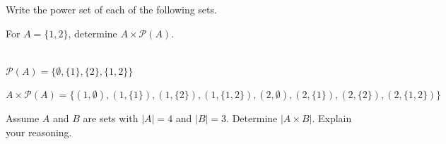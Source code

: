 \documentclass[12 pt]{exam}
\begin{document}
\begin{questions}

\question Write the power set of each of the following sets.


\question For $A=\{ 1, 2\}$, determine $A \times \mathcal{P}(A)$.

\begin{solution} \\
$\mathcal{P}(A) = \{\emptyset, \{1\}, \{2\}, \{1, 2\}\}$

$A \times \mathcal{P}(A) = \{(1, \emptyset), (1, \{1\}), (1, \{2\}), (1, \{1, 2\}), (2, \emptyset), (2, \{1\}), (2, \{2\}), (2, \{1, 2\})\}$
\end{solution}

\question Assume $A$ and $B$ are sets with $|A|=4$ and $|B|=3.$ Determine $|A \times B|$. Explain your reasoning.


\end{questions}
\end{document}
